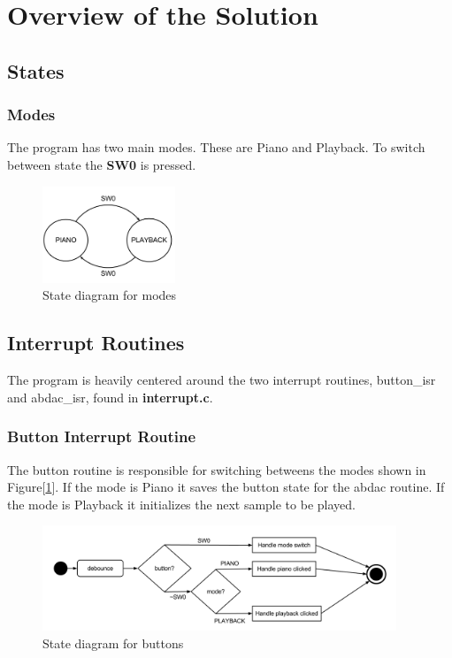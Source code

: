 \section{Overview of the Solution}

\subsection{States}

\subsubsection{Modes}

The program has two main modes. These are Piano and Playback. To switch between state the \textbf{SW0} is
pressed.

\begin{figure}[h]
  \centerline{\includegraphics[width=150px]{mode.png}}
  \caption{State diagram for modes}
  \label{modestates}
\end{figure}

\subsection{Interrupt Routines}
The program is heavily centered around the two interrupt routines, button\_isr and abdac\_isr, found in
\textbf{interrupt.c}.

\subsubsection{Button Interrupt Routine}
The button routine is responsible for switching betweens the modes shown in Figure[\ref{modestates}].
If the mode is Piano it saves the button state for the abdac routine. If the mode is Playback it initializes
the next sample to be played.
\begin{figure}[h]
  \centerline{\includegraphics[width=400px]{button_isr.png}}
  \caption{State diagram for buttons}
\end{figure}
\newpage
